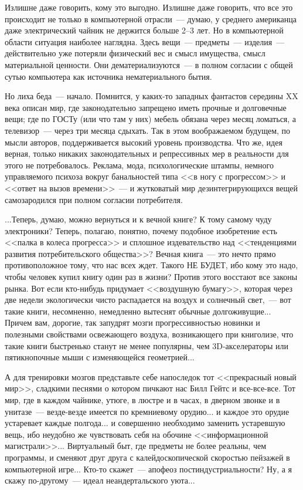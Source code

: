 \documentclass{scrbook}
\newcommand{\flqq}{<<}
\newcommand{\frqq}{>>}
\newcommand{\mdash}{~--- }
\newcommand{\ndash}{--}
\newcommand{\commamdash}{~--- } %
\begin{document}
Излишне даже говорить, кому это выгодно. Излишне даже говорить, что все это происходит не только в компьютерной отрасли{\mdash}думаю, у среднего американца даже электрический чайник не держится больше 2{\ndash}3 лет. Но в компьютерной области ситуация наиболее наглядна. Здесь вещи{\mdash}предметы{\mdash}изделия{\mdash}действительно уже потеряли физический вес и смысл имущества, смысл материальной ценности. Они дематериализуются{\mdash}в полном согласии с общей сутью компьютера как источника нематериального бытия.

Но лиха беда{\mdash}начало. Помнится, у каких-то западных фантастов середины XX века описан мир, где законодательно запрещено иметь прочные и долговечные вещи; где по ГОСТу (или что там у них) мебель обязана через месяц ломаться, а телевизор{\mdash}через три месяца сдыхать. Так в этом воображаемом будущем, по мысли авторов, поддерживается высокий уровень производства. Что же, идея верная, только никаких законодательных и репрессивных мер в реальности для этого не потребовалось. Реклама, мода, психологические штампы, немного управляемого психоза вокруг банальностей типа {\flqq}в ногу с прогрессом{\frqq} и {\flqq}ответ на вызов времени{\frqq}{\mdash}и жутковатый мир дезинтегрирующихся вещей самозародился при полном согласии потребителя.

...Теперь, думаю, можно вернуться и к вечной книге? К тому самому чуду электроники? Теперь, полагаю, понятно, почему подобное изобретение есть {\flqq}палка в колеса прогресса{\frqq} и сплошное издевательство над {\flqq}тенденциями развития потребительского общества{\frqq}? Вечная книга{\mdash}это нечто прямо противоположное тому, что нас всех ждет. Такого НЕ БУДЕТ, ибо кому это надо, чтобы человек купил книгу один раз в жизни? Против этого восстают все законы рынка. Вот если кто-нибудь придумает {\flqq}воздушную бумагу{\frqq}, которая через две недели экологически чисто распадается на воздух и солнечный свет,{\commamdash}вот такие книги, несомненно, немедленно вытеснят обычные долгоживущие... Причем вам, дорогие, так запудрят мозги прогрессивностью новинки и полезными свойствами освежающего воздуха, возникающего при книголизе, что такие книги быстренько станут не менее популярны, чем 3D-акселераторы или пятикнопочные мыши с изменяющейся геометрией...

А для тренировки мозгов представьте себе напоследок тот {\flqq}прекрасный новый мир{\frqq}, сладкими песнями о котором пичкают нас Билл Гейтс и все-все-все. Тот мир, где в каждом чайнике, утюге, в люстре и в часах, в дверном звонке и в унитазе{\mdash}везде-везде имеется по кремниевому орудию... и каждое это орудие устаревает каждые полгода... и совершенно необходимо заменить устаревшую вещь, ибо неудобно же чувствовать себя на обочине {\flqq}информационной магистрали{\frqq}... Виртуальный быт, где предметы не более реальны, чем программы, и сменяют друг друга с калейдоскопической скоростью пейзажей в компьютерной игре... Кто-то скажет{\mdash}апофеоз постиндустриальности? Ну, а я скажу по-другому{\mdash}идеал неандертальского уюта...
\end{document}
